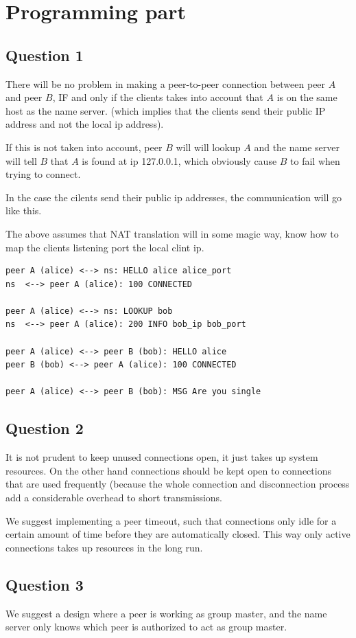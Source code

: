 \section{Programming part}
\subsection{Question 1}
There will be no problem in making a peer-to-peer connection between peer $A$
and peer $B$, IF and only if the clients takes into account that $A$ is on the
same host as the name server. (which implies that the clients send their public IP
address and not the local ip address).

If this is not taken into account, peer $B$ will will lookup $A$ and the name
server will tell $B$ that $A$ is found at ip 127.0.0.1, which obviously cause
$B$ to fail when trying to connect.

In the case the cilents send their public ip addresses, the communication will
go like this.

The above assumes that NAT translation will in some magic way, know how to
map the clients listening port the local clint ip.

\begin{lstlisting}
peer A (alice) <--> ns: HELLO alice alice_port
ns  <--> peer A (alice): 100 CONNECTED

peer A (alice) <--> ns: LOOKUP bob
ns  <--> peer A (alice): 200 INFO bob_ip bob_port

peer A (alice) <--> peer B (bob): HELLO alice
peer B (bob) <--> peer A (alice): 100 CONNECTED

peer A (alice) <--> peer B (bob): MSG Are you single
\end{lstlisting}

\subsection{Question 2}
It is not prudent to keep unused connections open, it just takes up system
resources. On the other hand connections should be kept open to connections
that are used frequently (because the whole connection and disconnection
process add a considerable overhead to short transmissions.

We suggest implementing a peer timeout, such that connections only idle for a
certain amount of time before they are automatically closed. This way only
active connections takes up resources in the long run.

\subsection{Question 3}
We suggest a design where a peer is working as group master, and the name
server only knows which peer is authorized to act as group master.

